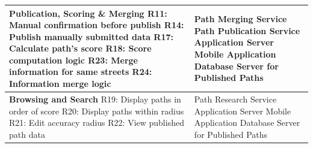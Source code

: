\begin{table}[H]
\begin{tabular}{|p{}|p{}|}
\textbf{Publication, Scoring \& Merging} \newline
R11: Manual confirmation before publish \newline
R14: Publish manually submitted data \newline
R17: Calculate path's score \newline
R18: Score computation logic \newline
R23: Merge information for same streets \newline
R24: Information merge logic &
Path Merging Service \newline
Path Publication Service \newline
Application Server \newline
Mobile Application \newline
Database Server for Published Paths \\
\hline

\textbf{Browsing and Search} \newline
R19: Display paths in order of score \newline
R20: Display paths within radius \newline
R21: Edit accuracy radius \newline
R22: View published path data & 
Path Research Service \newline
Application Server \newline
Mobile Application \newline
Database Server for Published Paths \\
\hline

\end{tabular}
\label{tab:req_traceability}
\end{table}